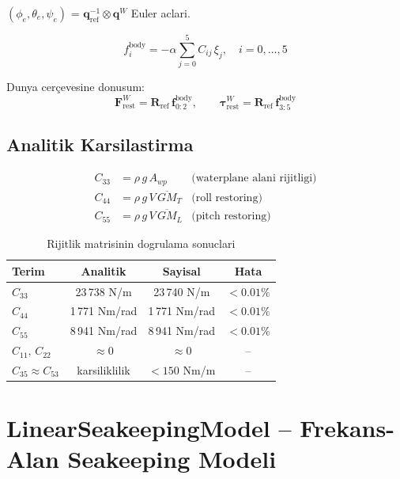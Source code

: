\documentclass[12pt,a4paper]{article}
\newcommand{\Fvec}{\mathbf{F}}
\begin{document}
$(\phi_e, \theta_e, \psi_e)$ = $\mathbf{q}_{\text{ref}}^{-1} \otimes \mathbf{q}^W$
Euler aclari.

\begin{equation}
  \boxed{
  f_i^{\text{body}} = -\alpha \sum_{j=0}^{5} C_{ij}\,\xi_j,
  \quad i=0,\ldots,5
  }
  \label{eq:restoring}
\end{equation}

Dunya cerçevesine donusum:
\begin{equation}
  \Fvec_{\text{rest}}^W = \mathbf{R}_{\text{ref}}\,\mathbf{f}_{0:2}^{\text{body}},
  \qquad
  \boldsymbol{\tau}_{\text{rest}}^W = \mathbf{R}_{\text{ref}}\,\mathbf{f}_{3:5}^{\text{body}}
  \label{eq:restoring_world}
\end{equation}

\subsection{Analitik Karsilastirma}

\begin{align}
  C_{33} &= \rho\,g\,A_{wp}
  &\text{(waterplane alani rijitligi)} \label{eq:c33} \\
  C_{44} &= \rho\,g\,V\,\overline{GM}_T
  &\text{(roll restoring)} \label{eq:c44} \\
  C_{55} &= \rho\,g\,V\,\overline{GM}_L
  &\text{(pitch restoring)} \label{eq:c55}
\end{align}

\begin{table}[H]
  \centering
  \caption{Rijitlik matrisinin dogrulama sonuclari}
  \begin{tabular}{lccc}
    \toprule
    \textbf{Terim} & \textbf{Analitik} & \textbf{Sayisal} & \textbf{Hata} \\
    \midrule
    $C_{33}$ & 23\,738 N/m & 23\,740 N/m & $<0.01\%$ \\
    $C_{44}$ & 1\,771 Nm/rad & 1\,771 Nm/rad & $<0.01\%$ \\
    $C_{55}$ & 8\,941 Nm/rad & 8\,941 Nm/rad & $<0.01\%$ \\
    $C_{11},\,C_{22}$ & $\approx 0$ & $\approx 0$ & -- \\
    $C_{35} \approx C_{53}$ & karsiliklilik & $<150$ Nm/m & -- \\
    \bottomrule
  \end{tabular}
\end{table}

\section{LinearSeakeepingModel -- Frekans-Alan Seakeeping Modeli}
\end{document}
